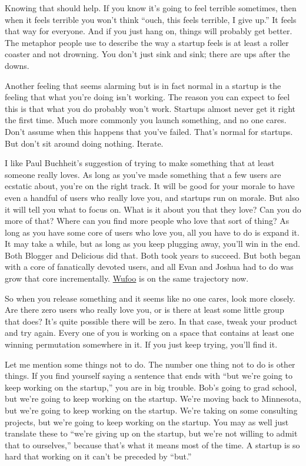 Knowing that should help. If you know it's going to feel terrible
sometimes, then when it feels terrible you won't think ``ouch, this
feels terrible, I give up.'' It feels that way for everyone. And if you
just hang on, things will probably get better. The metaphor people use
to describe the way a startup feels is at least a roller coaster and not
drowning. You don't just sink and sink; there are ups after the downs.

Another feeling that seems alarming but is in fact normal in a startup
is the feeling that what you're doing isn't working. The reason you can
expect to feel this is that what you do probably won't work. Startups
almost never get it right the first time. Much more commonly you launch
something, and no one cares. Don't assume when this happens that you've
failed. That's normal for startups. But don't sit around doing nothing.
Iterate.

I like Paul Buchheit's suggestion of trying to make something that at
least someone really loves. As long as you've made something that a few
users are ecstatic about, you're on the right track. It will be good for
your morale to have even a handful of users who really love you, and
startups run on morale. But also it will tell you what to focus on. What
is it about you that they love? Can you do more of that? Where can you
find more people who love that sort of thing? As long as you have some
core of users who love you, all you have to do is expand it. It may take
a while, but as long as you keep plugging away, you'll win in the end.
Both Blogger and Delicious did that. Both took years to succeed. But
both began with a core of fanatically devoted users, and all Evan and
Joshua had to do was grow that core incrementally.
\href{http://wufoo.com}{Wufoo} is on the same trajectory now.

So when you release something and it seems like no one cares, look more
closely. Are there zero users who really love you, or is there at least
some little group that does? It's quite possible there will be zero. In
that case, tweak your product and try again. Every one of you is working
on a space that contains at least one winning permutation somewhere in
it. If you just keep trying, you'll find it.

Let me mention some things not to do. The number one thing not to do is
other things. If you find yourself saying a sentence that ends with
``but we're going to keep working on the startup,'' you are in big
trouble. Bob's going to grad school, but we're going to keep working on
the startup. We're moving back to Minnesota, but we're going to keep
working on the startup. We're taking on some consulting projects, but
we're going to keep working on the startup. You may as well just
translate these to ``we're giving up on the startup, but we're not
willing to admit that to ourselves,'' because that's what it means most
of the time. A startup is so hard that working on it can't be preceded
by ``but.''

